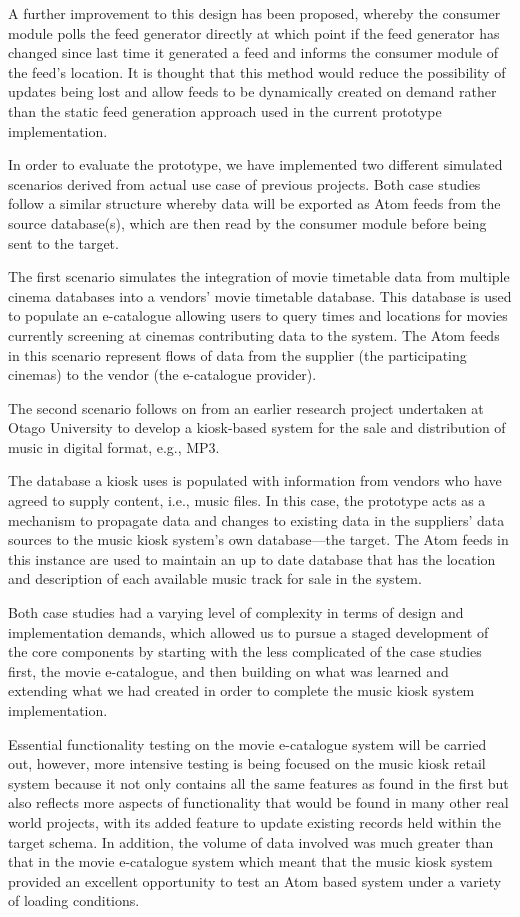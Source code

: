 \documentclass{CRPITStyle}
\begin{document}
A further improvement to this design has been proposed, whereby the
consumer module polls the feed generator directly at which point if the
feed generator has changed since last time it generated a feed and
informs the consumer module of the feed's location. It is thought that
this method would reduce the possibility of updates being lost and allow
feeds to be dynamically created on demand rather than the static
feed generation approach used in the current prototype implementation.

In order to evaluate the prototype, we have implemented two different
simulated scenarios derived from actual use case of previous projects.
Both case studies follow a similar structure whereby data will be
exported as Atom feeds from the source database(s), which are then read 
by the consumer module before being sent to the target.

The first scenario simulates the integration of movie timetable data
from multiple cinema databases into a vendors' movie timetable database.
This database is used to populate an e-catalogue allowing users to query
times and locations for movies currently screening at cinemas
contributing data to the system. The Atom feeds in this scenario
represent flows of data from the supplier (the participating cinemas) to 
the vendor (the e-catalogue provider).

The second scenario follows on from an earlier research project undertaken
at Otago University to develop a kiosk-based system for the sale and 
distribution of music in digital format, e.g., MP3.

The database a kiosk uses is populated with information from vendors who
have agreed to supply content, i.e., music files. In this case, the
prototype acts as a mechanism to propagate data and changes to existing
data in the suppliers' data sources to the music kiosk system's own
database---the target. The Atom feeds in this instance are used to
maintain an up to date database that has the location and description of
each available music track for sale in the system.

Both case studies had a varying level of complexity in terms of design
and implementation demands, which allowed us to pursue a staged
development of the core components by starting with the less complicated
of the case studies first, the movie e-catalogue, and then building on 
what was learned and extending what we had created in order to complete 
the music kiosk system implementation.

Essential functionality testing on the movie e-catalogue system will be
carried out, however, more intensive testing is being focused on the 
music kiosk retail system because it not only contains all the same 
features as found in the first but also reflects more aspects of 
functionality that would be found in many other real world projects, with
its added feature to update existing records held within the target schema.
In addition, the volume of data involved was much greater than that in the
movie e-catalogue system which meant that the music kiosk system provided
an excellent opportunity to test an Atom based system under a variety of 
loading conditions.
\end{document}
